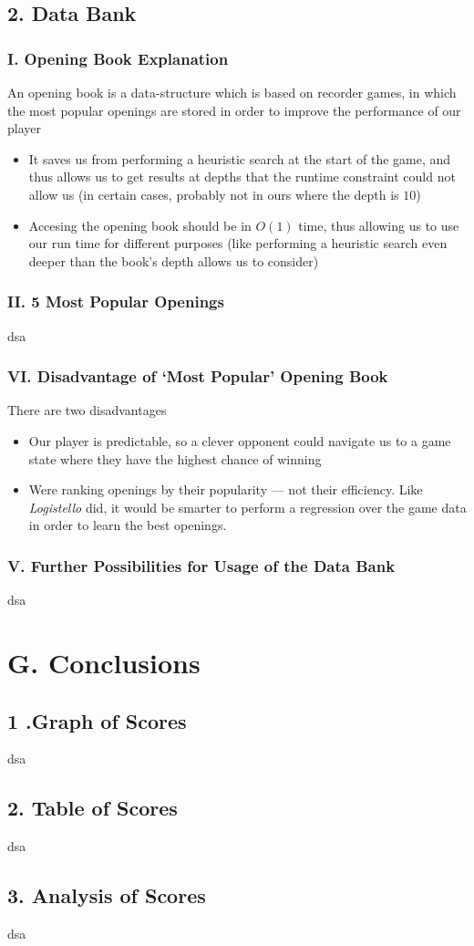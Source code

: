 \documentclass{article}
\begin{document}
\subsection*{2. Data Bank}
\subsubsection*{I. Opening Book Explanation}
An opening book is a data-structure which is based on recorder games, in which the most popular openings are stored in order to improve the performance of our player 
\begin{itemize}
\item It saves us from performing a heuristic search at the start of the game, and thus allows us to get results at depths that the runtime constraint could not allow us (in certain cases, probably not in ours where the depth is $10$)	
\item Accesing the opening book should be in $O(1)$ time, thus allowing us to use our run time for different purposes (like performing a heuristic search even deeper than the book's depth allows us to consider)
\end{itemize}

\subsubsection*{II. 5 Most Popular Openings}
dsa

\subsubsection*{VI. Disadvantage of `Most Popular' Opening Book}
There are two disadvantages
\begin{itemize}
\item Our player is predictable, so a clever opponent could navigate us to a game state where they have the highest chance of winning
\item Were ranking openings by their popularity --- not their efficiency. Like \emph{Logistello} did, it would be smarter to perform a regression over the game data in order to learn the best openings.
\end{itemize}

\subsubsection*{V. Further Possibilities for Usage of the Data Bank}
dsa

\section*{G. Conclusions}
\subsection*{1 .Graph of Scores}
dsa

\subsection*{2. Table of Scores}
dsa

\subsection*{3. Analysis of Scores}
dsa
\end{document}
